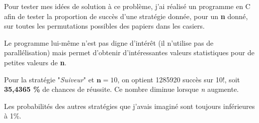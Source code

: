 \documentclass[a4paper,11pt]{article}
\begin{document}
Pour tester mes idées de solution à ce problème, j'ai réalisé un programme en C afin de tester la proportion de succès d'une stratégie donnée, pour un \textbf{n} donné, sur toutes les permutations possibles des papiers dans les casiers.

Le programme lui-même n'est pas digne d'intérêt (il n'utilise pas de parallélisation) mais permet d'obtenir d'intéressantes valeurs statistiques pour de petites valeurs de \textbf{n}.

Pour la stratégie "\textit{Suiveur}" et $\textbf{n} = 10$, on optient 1285920 succès sur 10!, soit \textbf{35,4365 \%} de chances de réussite. Ce nombre diminue lorsque \textit{n} augmente.

Les probabilités des autres stratégies que j'avais imaginé sont toujours inférieures à 1\%.

\end{document}

